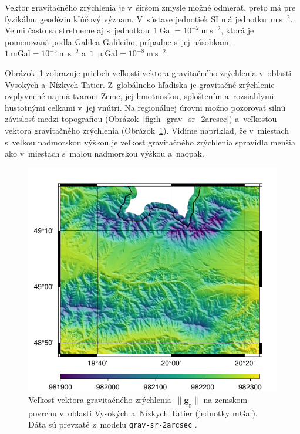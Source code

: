 \documentclass[a4paper, 12pt]{book}
\newcommand{\gidx}{\mathrm g}
\let\vec\mathbf
\begin{document}
Vektor gravitačného zrýchlenia je v~širšom zmysle možné odmerať, preto má pre 
fyzikálnu geodéziu kľúčový význam.  V~sústave jednotiek SI má 
jednotku~$\mathrm{m}\ \mathrm{s}^{-2}$.  Veľmi často sa stretneme aj 
s~jednotkou~$1\ \mathrm{Gal} = 10^{-2}\ \mathrm{m}\ \mathrm{s}^{-2}$, ktorá je 
pomenovaná podľa Galilea Galileiho, prípadne s~jej násobkami~$1\ \mathrm{mGal} 
= 10^{-5}\ \mathrm{m}\ \mathrm{s}^{-2}$ a~$1\ \upmu \mathrm{Gal} = 10^{-8}\ 
\mathrm{m}\ \mathrm{s}^{-2}$.

Obrázok~\ref{fig:gg_grav_sr_2arcsec} zobrazuje priebeh veľkosti vektora 
gravitačného zrýchlenia v~oblasti Vysokých a~Nízkych Tatier.  Z~globálneho 
hľadiska je gravitačné zrýchlenie ovplyvnené najmä tvarom Zeme, jej hmotnosťou, 
sploštením a~rozsiahlymi hustotnými celkami v~jej vnútri.  Na regionálnej 
úrovni možno pozorovať silnú závislosť medzi topografiou 
(Obrázok~\ref{fig:h_grav_sr_2arcsec}) a~veľkosťou vektora gravitačného 
zrýchlenia (Obrázok~\ref{fig:gg_grav_sr_2arcsec}).  Vidíme napríklad, že 
v~miestach s~veľkou nadmorskou výškou je veľkosť gravitačného zrýchlenia 
spravidla menšia ako v~miestach s~malou nadmorskou výškou a~naopak.

\begin{figure}
\centering
\includegraphics{./fig-gg-grav-sr-2arcsec.pdf}
\caption{Veľkosť vektora gravitačného zrýchlenia~$\| \vec g_\gidx \|$ na 
zemskom povrchu v~oblasti Vysokých a~Nízkych Tatier (jednotky mGal).  Dáta sú 
prevzaté z~modelu \texttt{grav-sr-2arcsec} \parencite{GravSR2arcsec}.}
\label{fig:gg_grav_sr_2arcsec}
\end{figure}
\end{document}
